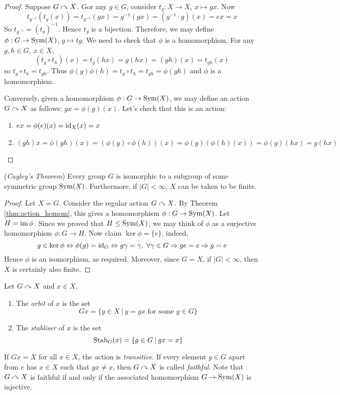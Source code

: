 \documentclass[10pt, a4paper, twoside]{report}
\begin{document}
\begin{proof}
    Suppose \(G\curvearrowright X\). Gor any \(g\in G\), consider \(t_g:X\to X\), \(x\mapsto gx\). Now
    \[t_{g^{-1}}(t_g(x))=t_{g^{-1}}(gx)=g^{-1}(gx)=(g^{-1}\cdot g)(x)=ex=x\]
    So \(t_{g^{-1}}=(t_g)^{-1}\). Hence \(t_g\) is a bijection. Therefore, we may define \(\phi:G\to\operatorname{Sym}(X)\), \(g\mapsto tg\). We need to check that \(\phi\) is a homomorphism. For any \(g,h\in G\), \(x\in X\), 
    \[(t_g\circ t_h)(x)=t_g(hx)=g(hx)=(gh)(x)=t_{gh}(x)\]
    so \(t_g\circ t_h=t_{gh}\). Thus \(\phi(g)\phi(h)=t_g\circ t_h=t_{gh}=\phi(gh)\) and \(\phi\) is a homomorphism.

    Conversely, given a homomorphism \(\phi:G\to\operatorname{Sym}(X)\), we may define an action \(G\curvearrowright X\) as follows: \(gx=\phi(g)(x)\). Let's check that this is an action:
    \begin{enumerate}
        \item \(ex=\phi(e)(x)=\operatorname{id}_X(x)=x\) 
        \item \((gh)x=\phi(gh)(x)=(\phi(g)\circ\phi(h))(x)=\phi(g)(\phi(h)(x))=\phi(g)(hx)=g(hx)\)
    \end{enumerate}
\end{proof}
\begin{theorem}
    (\emph{Cayley's Theorem}) Every group \(G\) is isomorphic to a subgroup of some symmetric group \(\operatorname{Sym}(X)\). Furthermore, if \(|G|<\infty\), \(X\) can be taken to be finite.
\end{theorem}
\begin{proof}
    Let \(X=G\). Consider the regular action \(G\curvearrowright X\). By Theorem \ref{thm:action_homom}, this gives a homomorphism \(\phi:G\to\operatorname{Sym}(X)\). Let \(H=\operatorname{im}\phi\). Since we proved that \(H\leq\operatorname{Sym}(X)\), we may think of \(\phi\) as a surjective homomorphism \(\phi:G\to H\). Now claim \(\ker\phi=\{e\}\), indeed,
    \[g\in\ker\phi\Leftrightarrow\phi(g)=\operatorname{id}_G\Leftrightarrow g\gamma=\gamma,\;\forall\gamma\in G\Rightarrow ge=e\Rightarrow g=e\]
    Hence \(\phi\) is an isomorphism, as required. Moreover, since \(G=X\), if \(|G|<\infty\), then \(X\) is certainly also finite.
\end{proof}
\begin{definition}
    Let \(G\curvearrowright X\) and \(x\in X\).
    \begin{enumerate}
        \item The \emph{orbit} of \(x\) is the set 
        \[Gx=\{y\in X\:|\:y=gx\text{  for some \(g\in G\)}\}\]
        \item The \emph{stabliser} of \(x\) is the set
        \[\operatorname{Stab}_G(x)=\{g\in G\:|\:gx=x\}\]
    \end{enumerate}
\end{definition}
If \(Gx=X\) for all \(x\in X\), the action is \emph{transitive}. If every element \(g\in G\) apart from \(e\) has \(x\in X\) such that \(gx\neq x\), then \(G\curvearrowright X\) is called \emph{faithful}. Note that \(G\curvearrowright X\) is faithful if and only if the associated homomorphism \(G\to\operatorname{Sym}(X)\) is injective.
\end{document}
